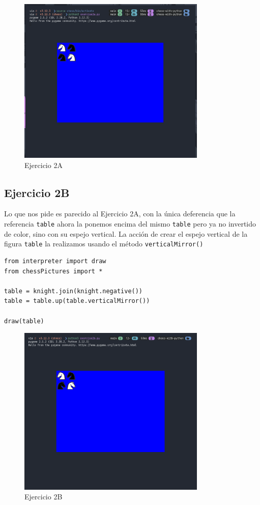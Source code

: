 \documentclass[10pt, a4paper]{article}
\newcommand{\mintpython}[1]{\texttt{#1}}
\begin{document}
\begin{figure}[H]
  \centering
  \includegraphics[width=0.8\textwidth]{img/exercise2a.png}
  \caption{Ejercicio 2A}
\end{figure}

\subsection{Ejercicio 2B}
Lo que nos pide es parecido al Ejercicio 2A, con la única deferencia que la referencia \mintpython{table} ahora la ponemos encima del mismo \mintpython{table} pero ya no invertido de color, sino con su espejo vertical. La acción de crear el espejo vertical de la figura \mintpython{table} la realizamos usando el método \mintpython{verticalMirror()}

\begin{verbatim}
from interpreter import draw
from chessPictures import *

table = knight.join(knight.negative())
table = table.up(table.verticalMirror())

draw(table)
\end{verbatim}

\begin{figure}[H]
  \centering
  \includegraphics[width=0.8\textwidth]{img/exercise2b.png}
  \caption{Ejercicio 2B}
\end{figure}
\end{document}
